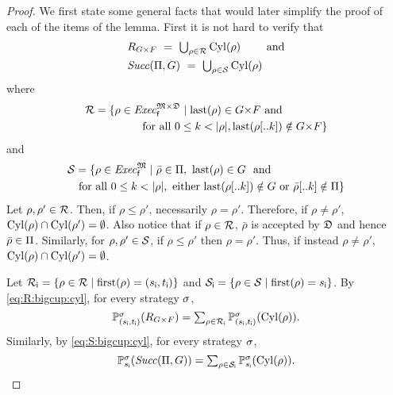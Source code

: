 \begin{proof}
  We first state some general facts that would later simplify the
  proof of each of the items of the lemma.
  First it is not hard to verify that
  \begin{align}
    & \textstyle
    R_{G{\times}F} \ = \ \bigcup_{\rho\in\mathcal{R}}\mathrm{Cyl}(\rho) \qquad\text{ and}\label{eq:R:bigcup:cyl}\\
    & \textstyle
    \mathit{Succ}(\Pi,G) \ = \ \bigcup_{\rho\in\mathcal{S}}\mathrm{Cyl}(\rho) \label{eq:S:bigcup:cyl}
  \end{align}
  where
  \begin{align*}
    \mathcal{R} = {}
    & \{{\rho\in\mathit{Exec}_{\mathsf{f}}^{{\mathfrak{M}}{\times}{\mathfrak{D}}}} \mid \mathrm{last}(\rho)\in{G{\times}F}\text{ and}\\
    & \qquad\quad\text{for all }0\leq k<{|}{\rho}{|},\mathrm{last}(\rho[..k])\notin{G{\times}F}\}
  \end{align*}
  and
  \begin{align*}
    \setS = {}
    & \{{\rho\in\execf^{\model}} \mid {\bar{\rho}\in\plans}, \ {\last(\rho)\in G} \ \text{ and}\\
    & \!\!\!\!\!\! \text{for all }0\leq k<\size{\rho}, \text{ either }{\last(\rho[..k])\notin G}\text{ or }{\bar{\rho}[..k]\notin\plans}\}
  \end{align*}
  Let $\rho,\rho'\in\mathcal{R}$.  Then, if $\rho\leq\rho'$,
  necessarily $\rho=\rho'$.  Therefore, if $\rho\neq\rho'$,
  $\mathrm{Cyl}(\rho)\cap\mathrm{Cyl}(\rho')=\emptyset$.  Also notice that if
  $\rho\in\mathcal{R}$, $\bar{\rho}$ is accepted by ${\mathfrak{D}}$ and hence
  $\bar{\rho}\in\Pi$.
  Similarly, for $\rho,\rho'\in\mathcal{S}$, if $\rho\leq\rho'$ then
  $\rho=\rho'$.  Thus, if instead $\rho\neq\rho'$,
  $\mathrm{Cyl}(\rho)\cap\mathrm{Cyl}(\rho')=\emptyset$.

  Let
  $\mathcal{R}_{\mathsf{i}}=\{{\rho\in\mathcal{R}}\mid{\mathrm{first}(\rho)=({s_{\textsf{i}}},{t_{\textsf{i}}})}\}$
  and
  $\mathcal{S}_{\mathsf{i}}=\{{\rho\in\mathcal{S}}\mid{\mathrm{first}(\rho)={s_{\textsf{i}}}}\}$.
  By \cref{eq:R:bigcup:cyl}, for every strategy $\sigma$,
  \begin{equation}\label{eq:prob:R:bigcup:cyl}
    \textstyle
    \mathbb{P}^{\sigma}_{({s_{\textsf{i}}},{t_{\textsf{i}}})}(R_{G{\times}F}) =
    \sum_{\rho\in\mathcal{R}_{\mathsf{i}}}\mathbb{P}^{\sigma}_{({s_{\textsf{i}}},{t_{\textsf{i}}})}(\mathrm{Cyl}(\rho)).
  \end{equation}
  Similarly, by \cref{eq:S:bigcup:cyl}, for every strategy $\sigma$,
  \begin{equation}\label{eq:prob:S:bigcup:cyl}
    \textstyle
    \mathbb{P}^{\sigma}_{{s_{\textsf{i}}}}(\mathit{Succ}(\Pi,G)) =
    \sum_{\rho\in\mathcal{S}_{\mathsf{i}}}\mathbb{P}^{\sigma}_{{s_{\textsf{i}}}}(\mathrm{Cyl}(\rho)).
  \end{equation}


\end{proof}
